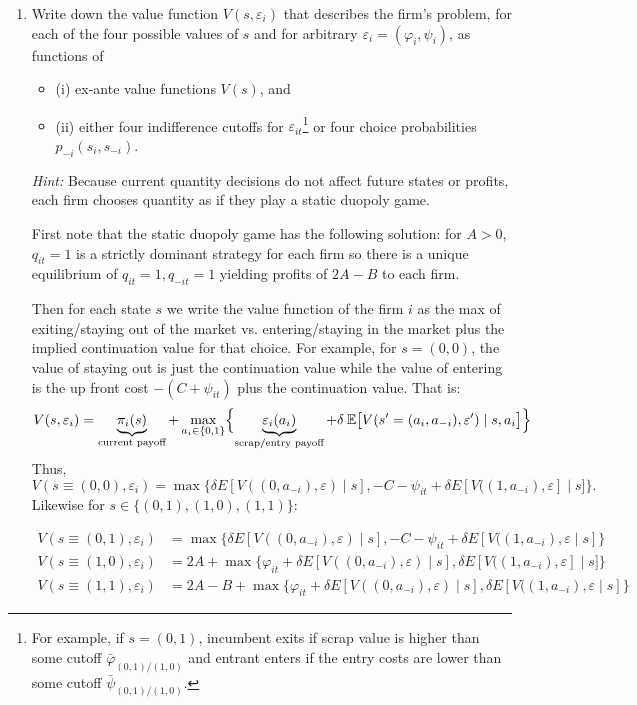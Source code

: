 \documentclass{article}
\begin{document}
\begin{enumerate}
    \item Write down the value function $V(s, \varepsilon_i)$ that describes the firm’s problem, for each of the four possible values of $s$ and for arbitrary $\varepsilon_i = (\varphi_i, \psi_i)$, as functions of
    \begin{itemize}
        \item (i) ex-ante value functions $V(s)$, and
        \item (ii) either four indifference cutoffs for $\varepsilon_{it}$\footnote{For example, if $s = (0,1)$, incumbent exits if scrap value is higher than some cutoff $\bar{\varphi}_{(0,1)/(1,0)}$ and entrant enters if the entry costs are lower than some cutoff $\bar{\psi}_{(0,1)/(1,0)}$.}
        or four choice probabilities $p_{-i}(s_i, s_{-i})$.
    \end{itemize}

    \textit{Hint:} Because current quantity decisions do not affect future states or profits, each firm chooses quantity as if they play a static duopoly game.

\begin{answer}
First note that the static duopoly game has the following solution: for $A>0$, $q_{it}=1$ is a strictly dominant strategy for each firm so there is a unique equilibrium of $q_{it}=1,q_{-it}=1$ yielding profits of $2A-B$ to each firm.


Then for each state $s$ we write the value function of the firm $i$ as the max of exiting/staying out of the market vs. entering/staying in the market plus the implied continuation value for that choice. For example, for $s = (0,0)$, the value of staying out is just the continuation value while the value of entering is the up front cost $-(C + \psi_{it})$ plus the continuation value. That is:
\[
  V(s,\varepsilon_i)
  = \underbrace{\pi_i(s)}_{\text{current payoff}} + \max_{a_i\in\{0,1\}}
    \Bigl\{
\underbrace{\varepsilon_i(a_i)}_{\text{scrap/entry payoff}}
+\delta \: \mathbb{E}\bigl[V(s'=(a_i,a_{-i}),\varepsilon')\mid s,a_i\bigr]\Bigr\}
\]
Thus, 
\begin{equation*}
    V(s \equiv (0,0),\varepsilon_i) = \max \{ \delta E[ V((0,a_{{-i}}),\varepsilon)\mid s],  -C - \psi_{it} +\delta E[ V((1,a_{{-i}}),\varepsilon] \mid s]\}.
\end{equation*}
Likewise for $s \in \{(0,1), (1,0), (1,1)\}$:

 \begin{align*}
 V(s \equiv (0,1),\varepsilon_i) & = \max \{  \delta E[ V((0,a_{{-i}}),\varepsilon) \mid s], -C- \psi_{it} + \delta E[ V((1,a_{{-i}}),\varepsilon \mid s] \} \\
 V(s \equiv (1,0),\varepsilon_i) & =2A +  \max \{ \varphi_{it}+ \delta E[ V((0,a_{{-i}}),\varepsilon) \mid s], \delta E[ V((1,a_{{-i}}),\varepsilon] \mid s]\} \\
 V(s \equiv (1,1),\varepsilon_i) & = 2A-B +\max \{\varphi_{it} + \delta E[ V((0,a_{{-i}}),\varepsilon) \mid s], \delta E[ V((1,a_{{-i}}),\varepsilon \mid s] \} 
\end{align*}


\end{answer}
\end{enumerate}
\end{document}
